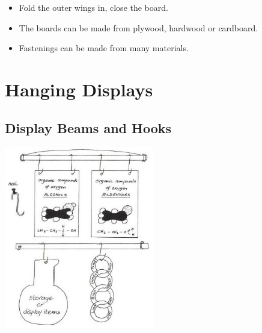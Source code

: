 \begin{multicols}{2}
\begin{itemize}
\item Fold the outer wings in,
close the board.
\item The boards can be made from
plywood, hardwood or
cardboard.
\item Fastenings can be made from
many materials.
\end{itemize}

%
%


\section{Hanging Displays}


\subsection{Display Beams and Hooks}

\begin{center}
\includegraphics[width=0.49\textwidth]{./img/vso/display-beams-hooks.jpg}
\end{center}


\end{multicols}
